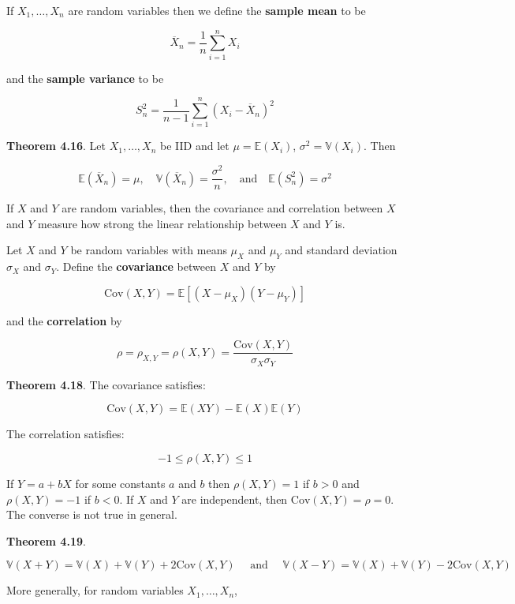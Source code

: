 If \(X_{1}, \dots, X_{n}\) are random variables then we define the
\textbf{sample mean} to be

\[ \overline{X}_{n} = \frac{1}{n} \sum_{i=1}^{n} X_{i}  \]

and the \textbf{sample variance} to be

\[ S_{n}^{2} = \frac{1}{n - 1} \sum_{i=1}^{n} \left(X_{i} - \overline{X}_{n}\right)^{2} \]

\textbf{Theorem 4.16}. Let \(X_{1}, \dots, X_{n}\) be IID and let
\(\mu = \mathbb{E}(X_{i})\), \(\sigma^{2} = \mathbb{V}(X_{i})\). Then

\[ 
\mathbb{E}\left(\overline{X}_{n}\right) = \mu,
\quad
\mathbb{V}\left(\overline{X}_{n}\right) = \frac{\sigma^{2}}{n},
\quad \text{and} \quad
\mathbb{E}\left(S_{n}^{2}\right) = \sigma^{2}
\]

If \(X\) and \(Y\) are random variables, then the covariance and
correlation between \(X\) and \(Y\) measure how strong the linear
relationship between \(X\) and \(Y\) is.

Let \(X\) and \(Y\) be random variables with means \(\mu_X\) and
\(\mu_Y\) and standard deviation \(\sigma_X\) and \(\sigma_Y\). Define
the \textbf{covariance} between \(X\) and \(Y\) by

\[ \text{Cov}(X, Y) = \mathbb{E}[(X - \mu_X)(Y - \mu_Y)] \]

and the \textbf{correlation} by

\[ \rho = \rho_{X, Y} = \rho(X, Y) = \frac{\text{Cov}(X, Y)}{\sigma_X \sigma_Y} \]

\textbf{Theorem 4.18}. The covariance satisfies:

\[ \text{Cov}(X, Y) = \mathbb{E}(XY) - \mathbb{E}(X) \mathbb{E}(Y) \]

The correlation satisfies:

\[ -1 \leq \rho(X, Y) \leq 1 \]

If \(Y = a + bX\) for some constants \(a\) and \(b\) then
\(\rho(X, Y) = 1\) if \(b > 0\) and \(\rho(X, Y) = -1\) if \(b < 0\). If
\(X\) and \(Y\) are independent, then \(\text{Cov}(X, Y) = \rho = 0\).
The converse is not true in general.

\textbf{Theorem 4.19}.

\[ 
\mathbb{V}(X + Y) = \mathbb{V}(X) + \mathbb{V}(Y) + 2 \text{Cov}(X, Y)
\quad \text{ and } \quad
\mathbb{V}(X - Y) = \mathbb{V}(X) + \mathbb{V}(Y) - 2 \text{Cov}(X, Y)
\]

More generally, for random variables \(X_{1}, \dots, X_{n}\),

